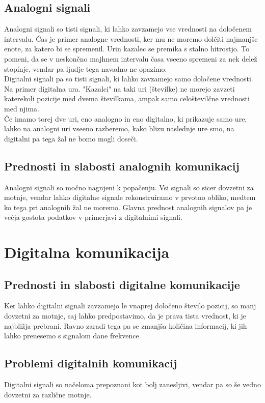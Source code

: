 \documentclass[12pt]{article}
\begin{document}
    \subsection{Analogni signali}
        Analogni signali so tisti signali, ki lahko zavzamejo vse vrednosti
        na določenem intervalu. Čas je primer analogne vrednosti, ker mu ne
        moremo dolčiti najmanjše enote, za katero bi se spremenil. Urin
        kazalec se premika s stalno hitrostjo. To pomeni, da se v neskončno
        majhnem intervalu časa vseeno spremeni za nek delež stopinje, vendar
        pa ljudje tega navadno ne opazimo.\\
        Digitalni signali pa so tisti signali, ki lahko zavzamejo samo 
        določene vrednosti. Na primer digitalna ura. "Kazalci" na taki uri 
        (številke) ne morejo zavzeti katerekoli pozicije med dvema 
        številkama, ampak samo celoštevilčne vrednosti med njima.\\
        Če imamo torej dve uri, eno analogno in eno digitalno, ki prikazuje
        samo ure, lahko na analogni uri vseeno razberemo, kako blizu 
        naslednje ure smo, na digitalni pa tega žal ne bomo mogli doseči.
    \subsection{Prednosti in slabosti analognih komunikacij}
        Analogni signali so močno nagnjeni k popačenju. Vsi signali so sicer 
        dovzetni za motnje, vendar lahko digitalne signale rekonstruiramo v 
        prvotno obliko, medtem ko tega pri analognih žal ne moremo. Glavna 
        prednost analognih signalov pa je večja gostota podatkov v primerjavi z
        digitalnimi signali.

\newpage
\section{Digitalna komunikacija}
    \subsection{Prednosti in slabosti digitalne komunikacije}
        Ker lahko digitalni signali zavzamejo le vnaprej določeno število 
        pozicij, so manj dovzetni za motnje, saj lahko predpostavimo, da je 
        prava tista vrednost, ki je najbližja prebrani. Ravno zaradi tega pa se 
        zmanjša količina informacij, ki jih lahko prenesemo s signalom dane 
        frekvence.
    \subsection{Problemi digitalnih komunikacij}
        Digitalni signali so načeloma prepoznani kot bolj zanesljivi, vendar pa
        so še vedno dovzetni za različne motnje.
\end{document}
